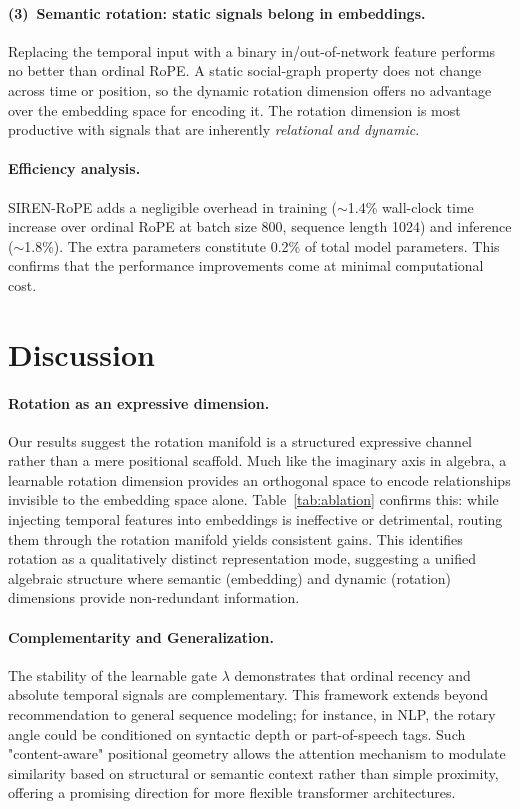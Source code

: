 \documentclass{article}
\begin{document}
\paragraph{(3)~Semantic rotation: static signals belong in embeddings.}
Replacing the temporal input with a binary in/out-of-network feature
performs no better than ordinal RoPE. A static social-graph property does
not change across time or position, so the dynamic rotation dimension
offers no advantage over the embedding space for encoding it. The rotation
dimension is most productive with signals that are inherently
\emph{relational and dynamic}.

\paragraph{Efficiency analysis.}
SIREN-RoPE adds a negligible overhead in training ($\sim$1.4\% wall-clock
time increase over ordinal RoPE at batch size 800, sequence length 1024) and
inference ($\sim$1.8\%). The extra parameters constitute 0.2\% of total model
parameters. This confirms that the performance improvements come at minimal
computational cost.


\section{Discussion}
\label{sec:discussion}

\paragraph{Rotation as an expressive dimension.}
Our results suggest the rotation manifold is a structured expressive channel rather than a mere positional scaffold. 
Much like the imaginary axis in algebra, a learnable rotation dimension provides an orthogonal space to encode 
relationships invisible to the embedding space alone. Table~\ref{tab:ablation} confirms this: while injecting temporal 
features into embeddings is ineffective or detrimental, routing them through the rotation manifold yields consistent gains. 
This identifies rotation as a qualitatively distinct representation mode, suggesting a unified algebraic structure where 
semantic (embedding) and dynamic (rotation) dimensions provide non-redundant information.

\paragraph{Complementarity and Generalization.}
The stability of the learnable gate $\lambda$ demonstrates that ordinal recency and absolute temporal signals are 
complementary. This framework extends beyond recommendation to general sequence modeling; for instance, in NLP, 
the rotary angle could be conditioned on syntactic depth or part-of-speech tags. Such "content-aware" positional geometry 
allows the attention mechanism to modulate similarity based on structural or semantic context rather than simple proximity, 
offering a promising direction for more flexible transformer architectures.
\end{document}
